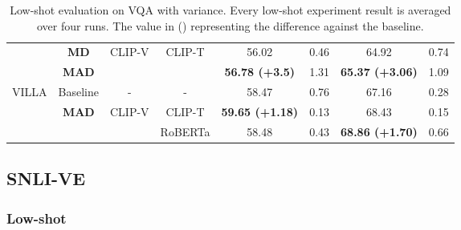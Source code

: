 \documentclass[runningheads]{llncs}
\begin{document}
\begin{table}[h!]
{\begin{tabular}{|c|c|cc|clcl|}
                                                                        & \textbf{MD}    & \multicolumn{1}{c|}{\multirow{2}{*}{CLIP-V}}      & \multirow{2}{*}{CLIP-T}      & \multicolumn{1}{c|}{56.02}                        & \multicolumn{1}{l|}{0.46}      & \multicolumn{1}{c|}{64.92}                                  & 0.74                \\ \cline{2-2} \cline{5-8}
                                                                        & \textbf{MAD}   & \multicolumn{1}{c|}{}                             &                              & \multicolumn{1}{c|}{\textbf{56.78 (+3.5)}}        & \multicolumn{1}{l|}{1.31}      & \multicolumn{1}{c|}{\textbf{65.37 (+3.06)}}                 & 1.09                \\ \hline
\multirow{3}{*}{VILLA}                                                  & Baseline              & \multicolumn{1}{c|}{-}                            & -                            & \multicolumn{1}{c|}{58.47}                        & \multicolumn{1}{l|}{0.76}      & \multicolumn{1}{c|}{67.16}                                  & 0.28                \\ \cline{2-8}
                                                                        & \textbf{MAD}   & \multicolumn{1}{c|}{\multirow{2}{*}{CLIP-V}}      & CLIP-T                       & \multicolumn{1}{c|}{\textbf{59.65 (+1.18)}}       & \multicolumn{1}{l|}{0.13}      & \multicolumn{1}{c|}{68.43}                                  & 0.15                \\ \cline{2-2} \cline{4-8}
                                                                        &                       & \multicolumn{1}{c|}{}                             & RoBERTa                      & \multicolumn{1}{c|}{58.48}                        & \multicolumn{1}{l|}{0.43}      & \multicolumn{1}{c|}{\textbf{68.86 (+1.70)}}                 & 0.66                \\ \hline
\end{tabular}}
\caption{Low-shot evaluation on VQA with variance. Every low-shot experiment result is averaged over four runs.  The value in () representing the difference against the baseline.}
\label{tab:vqalowshot}
\end{table}

\subsection{SNLI-VE}
\subsubsection{Low-shot}
\end{document}
